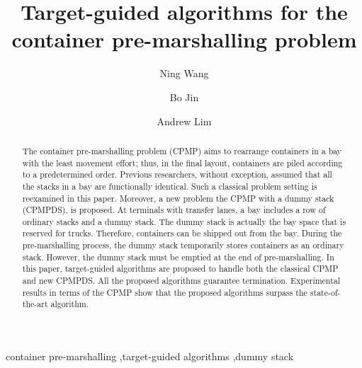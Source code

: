 \documentclass[review,3p,times,authoryear,12pt]{elsarticle}
\begin{document}
\graphicspath{{./figure/}}
\begin{frontmatter}
\newpage

\title{Target-guided algorithms for the container pre-marshalling problem}

\author[shu]{Ning Wang}

\author[cityu]{Bo Jin}

\author[nju]{Andrew Lim}

\address[shu]{
Department of Information Management, School of Management, Shanghai University, Shanghai, China
}

\address[cityu]{
Department of Management Sciences, City University of Hong Kong, Kowloon Tong, Hong Kong
}

\address[nju]{International Center of Management Science and Engineering, School of Management and Engineering, Nanjing University, Nanjing, Jiangsu, China}



\begin{abstract}
The container pre-marshalling problem (CPMP) aims to rearrange containers in a bay with the least movement effort; thus, in the final layout, containers are piled according to a predetermined order.
Previous researchers, without exception, assumed that all the stacks in a bay are functionally identical.
Such a classical problem setting is reexamined in this paper.
Moreover, a new problem the CPMP with a dummy stack (CPMPDS), is proposed.
At terminals with transfer lanes, a bay includes a row of ordinary stacks and a dummy stack.
The dummy stack is actually the bay space that is reserved for trucks.
Therefore, containers can be shipped out from the bay.
During the pre-marshalling process, the dummy stack temporarily stores containers as an ordinary stack.
However, the dummy stack must be emptied at the end of pre-marshalling.
In this paper, target-guided algorithms are proposed to handle both the classical CPMP and new CPMPDS.
All the proposed algorithms guarantee termination.
Experimental results in terms of the CPMP show that the proposed algorithms surpass the state-of-the-art algorithm.
\end{abstract}

\begin{keyword}
container pre-marshalling \sep target-guided algorithms \sep dummy stack%
\end{keyword}
\end{frontmatter}
\end{document}

